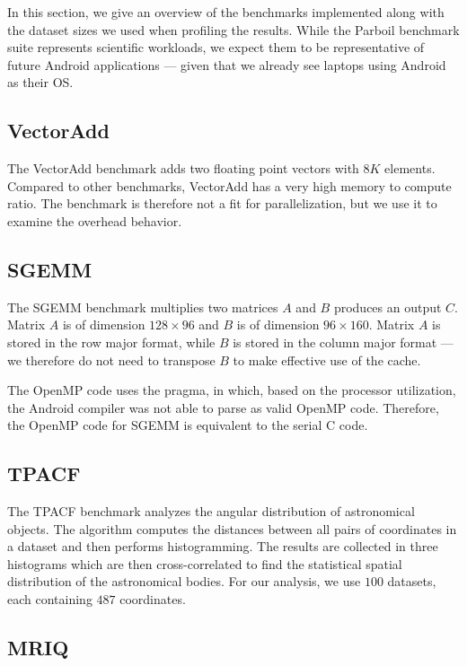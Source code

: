 In this section, we give an overview of the benchmarks implemented along with 
	the dataset sizes we used when profiling the results.
While the Parboil benchmark suite represents scientific workloads, we expect them to be 
	representative of future Android applications --- given that we already 
	see laptops using Android as their OS.

\subsection{VectorAdd}

The VectorAdd benchmark adds two floating point vectors with $8K$ elements.
Compared to other benchmarks, VectorAdd has a very high memory to compute ratio.
The benchmark is therefore not a fit for parallelization, but we use it to examine
  the overhead behavior.

\subsection{SGEMM}

The SGEMM benchmark multiplies two matrices $A$ and $B$ produces an output $C$.
Matrix $A$ is of dimension $128 \times 96$ and $B$ is of dimension $96 \times 160$.
Matrix $A$ is stored in the row major format, while $B$ is stored in the column major format ---
	we therefore do not need to transpose $B$ to make effective use of the cache.

The OpenMP code uses the 
	pragma, in which, based on the processor utilization,
	the Android compiler was not able to parse as valid OpenMP code.
Therefore, the OpenMP code for SGEMM is equivalent to the serial C code.

\subsection{TPACF}

The TPACF benchmark analyzes the angular distribution of astronomical objects.
The algorithm computes the distances between all pairs of coordinates in a dataset
	and then performs histogramming.
The results are collected in three histograms which are then cross-correlated to find
	the statistical spatial distribution of the astronomical bodies.
For our analysis, we use $100$ datasets, each containing $487$ coordinates.

\subsection{MRIQ}


